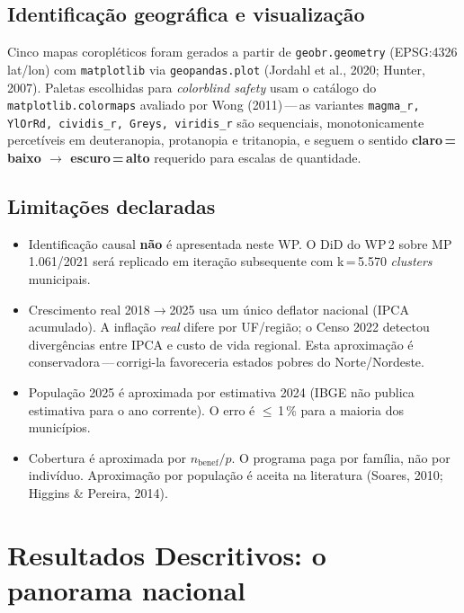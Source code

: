 \documentclass[12pt,a4paper,oneside]{article}
\begin{document}
\subsection{Identificação geográfica e visualização}\label{sec:metodo:viz}

Cinco mapas coropléticos foram gerados a partir de \texttt{geobr.geometry}
(EPSG:4326 lat/lon) com \texttt{matplotlib} via \texttt{geopandas.plot}
(Jordahl et al., 2020; Hunter, 2007). Paletas escolhidas para
\textit{colorblind safety} usam o catálogo do
\texttt{matplotlib.colormaps} avaliado por
Wong (2011)\,---\,as variantes \texttt{magma\_r, YlOrRd, cividis\_r,
Greys, viridis\_r} são sequenciais, monotonicamente
percetíveis em deuteranopia, protanopia e tritanopia, e seguem o
sentido \textbf{claro\,=\,baixo $\rightarrow$ escuro\,=\,alto} requerido
para escalas de quantidade.

\subsection{Limitações declaradas}\label{sec:metodo:limites}

\begin{itemize}\itemsep3pt
\item Identificação causal \textbf{não} é apresentada neste WP. O DiD do
  WP\,2 sobre MP 1.061/2021 será replicado em iteração subsequente com
  k\,=\,5.570 \textit{clusters} municipais.
\item Crescimento real 2018$\to$2025 usa um único deflator nacional (IPCA
  acumulado). A inflação \textit{real} difere por UF/região; o Censo 2022
  detectou divergências entre IPCA e custo de vida regional. Esta
  aproximação é conservadora\,---\,corrigi-la favoreceria estados pobres
  do Norte/Nordeste.
\item População 2025 é aproximada por estimativa 2024 (IBGE não publica
  estimativa para o ano corrente). O erro é $\leq$\,1\,\% para a maioria
  dos municípios.
\item Cobertura é aproximada por $n_{\text{benef}}/p$. O programa paga
  por família, não por indivíduo. Aproximação por população é aceita na
  literatura (Soares, 2010; Higgins \& Pereira, 2014).
\end{itemize}

\section{Resultados Descritivos: o panorama nacional}\label{sec:eda}
\end{document}
